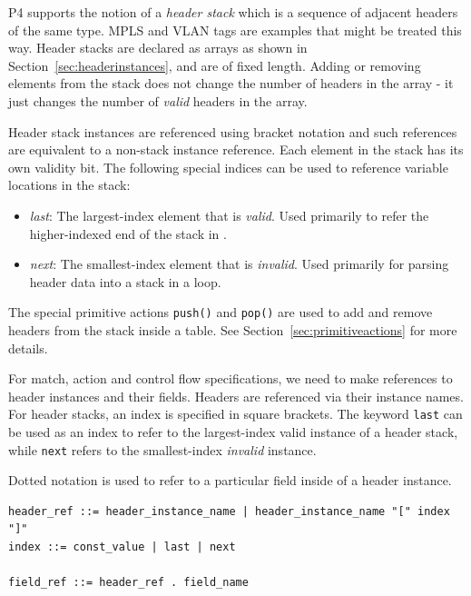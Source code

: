 \documentclass[12pt]{article}
\begin{document}
P4 supports the notion of a \textit{header stack} which is a sequence of
adjacent headers of the same type. MPLS and VLAN tags are examples that might
be treated this way.  Header stacks are declared as arrays as shown in
Section~\ref{sec:headerinstances}, and are of fixed length. Adding or removing
elements from the stack does not change the number of headers in the array - it
just changes the number of \textit{valid} headers in the array.

Header stack instances are referenced using bracket notation and such
references are equivalent to a non-stack instance reference. Each
element in the stack has its own validity bit. The following special
indices can be used to reference variable locations in the stack:

\begin{itemize}
\item
\textit{last}: The largest-index element that is \textit{valid}.
Used primarily to refer the higher-indexed end of the stack in \matchaction.
\item
\textit{next}: The smallest-index element that is \textit{invalid}.
Used primarily for parsing header data into a stack in a loop.
\end{itemize}

The special primitive actions \texttt{push()} and \texttt{pop()} are used to add 
and remove headers from the stack inside a \matchaction table. See Section~\ref{sec:primitiveactions} 
for more details.


For match, action and control flow specifications, we need to make
references to header instances and their fields. Headers are
referenced via their instance names.  For header stacks, an index is
specified in square brackets. The keyword \texttt{last} can be used as an
index to refer to the largest-index valid instance of a header stack, while
\texttt{next} refers to the smallest-index \textit{invalid} instance.

Dotted notation is used to refer to a particular field inside of a header
instance. 

\begin{lstlisting}[style=BNFstyle]
header_ref ::= header_instance_name | header_instance_name "[" index "]"
index ::= const_value | last | next

field_ref ::= header_ref . field_name
\end{lstlisting}
\end{document}
